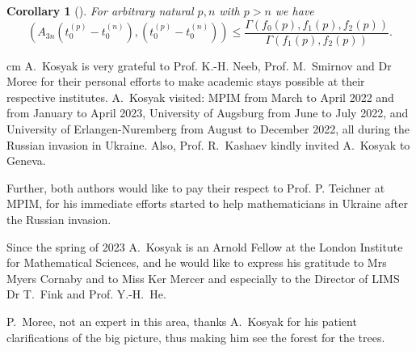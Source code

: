 \documentclass[preprint,12pt]{elsarticle}
\newtheorem{cor}[thm]{Corollary}
\numberwithin{equation}{section}
\begin{document}
\begin{cor} [\cite{Kos-m-Arx23, Kos-hpl-arx20}] For arbitrary natural $p,n$ with $p>n$ we have
\label{cor.t(p,n)}
\begin{equation}
 \label{t(p,n)<}
(A_{3n}(t_0^{(p)}-t_0^{(n)}),(t_0^{(p)}-t_0^{(n)}))
\leq 
\frac{\Gamma(f_0(p),f_1(p),f_2(p))}{\Gamma(f_1(p),f_2(p))}.
\end{equation}
\end{cor}

\fi


 cm
A.~Kosyak is very grateful to Prof. K.-H. Neeb, Prof. M.~Smirnov and 
Dr Moree
for their personal efforts  to make academic  stays possible at their respective institutes. A.~Kosyak  visited: MPIM from March to April 2022 and from January to April 2023,
University of Augsburg from June to July 2022, and  University of Erlangen-Nuremberg 
from August to December 2022, all during the Russian invasion in Ukraine.
Also, Prof. R.~Kashaev  kindly invited A.~Kosyak to Geneva.

Further, both authors would like  to pay their respect to Prof. P. Teichner at MPIM, for his
immediate efforts started to help mathematicians
in Ukraine  after the Russian invasion.

Since the spring of 2023 A.~Kosyak is an Arnold Fellow at the
London Institute for Mathematical Sciences, and he would like to express
his gratitude to  Mrs Myers Cornaby   
and to Miss Ker Mercer 
and especially to the Director of LIMS Dr T.~Fink and Prof. Y.-H.~He.


P.~Moree, not an expert in this area, thanks 
A.~Kosyak for his patient clarifications of the big picture,  thus making him see the forest for the trees.
\end{document}

